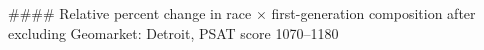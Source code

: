 #### Relative percent change in race × first-generation composition after excluding Geomarket: Detroit, PSAT score 1070–1180
